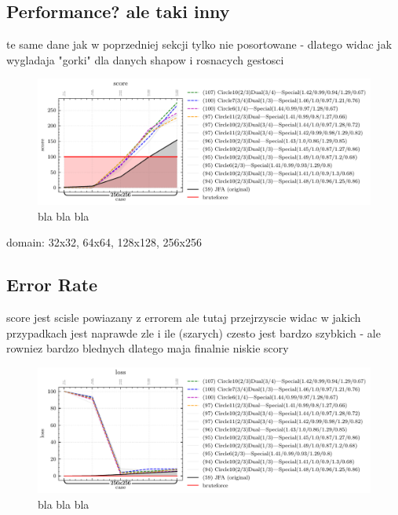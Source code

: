 \documentclass{article}
\begin{document}
\subsection{Performance? ale taki inny} %

te same dane jak w poprzedniej sekcji tylko nie posortowane - dlatego widac jak
wygladaja "gorki" dla danych shapow i rosnacych gestosci

\begin{figure}[H]
	\centering
	\includegraphics[width=\linewidth]{../figures/figure-3-score}
	\caption{bla bla bla}
	\label{fig:abstract}
\end{figure}

\begin{table}[H]
	\centering
	
	\newline
	\caption{domain: 32x32, 64x64, 128x128, 256x256}
\end{table}

\subsection{Error Rate} %

score jest scisle powiazany z errorem ale tutaj przejrzyscie widac w jakich
przypadkach jest naprawde zle i ile (szarych) czesto jest bardzo szybkich - ale
rowniez bardzo blednych dlatego maja finalnie niskie scory

\begin{figure}[H]
	\centering
	\includegraphics[width=\linewidth]{../figures/figure-2-loss}
	\caption{bla bla bla}
	\label{fig:abstract}
\end{figure}
\end{document}
